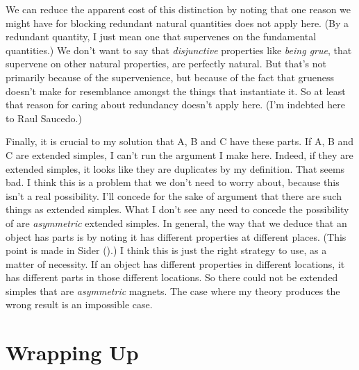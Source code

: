 \documentclass[
  10pt,
  letterpaper,
  DIV=11,
  numbers=noendperiod,
  twoside]{scrartcl}
\begin{document}
We can reduce the apparent cost of this distinction by noting that one
reason we might have for blocking redundant natural quantities does not
apply here. (By a redundant quantity, I just mean one that supervenes on
the fundamental quantities.) We don't want to say that
\emph{disjunctive} properties like \emph{being grue}, that supervene on
other natural properties, are perfectly natural. But that's not
primarily because of the supervenience, but because of the fact that
grueness doesn't make for resemblance amongst the things that
instantiate it. So at least that reason for caring about redundancy
doesn't apply here. (I'm indebted here to Raul Saucedo.)

Finally, it is crucial to my solution that A, B and C have these parts.
If A, B and C are extended simples, I can't run the argument I make
here. Indeed, if they are extended simples, it looks like they are
duplicates by my definition. That seems bad. I think this is a problem
that we don't need to worry about, because this isn't a real
possibility. I'll concede for the sake of argument that there are such
things as extended simples. What I don't see any need to concede the
possibility of are \emph{asymmetric} extended simples. In general, the
way that we deduce that an object has parts is by noting it has
different properties at different places. (This point is made in Sider
().) I think this is just the right
strategy to use, as a matter of necessity. If an object has different
properties in different locations, it has different parts in those
different locations. So there could not be extended simples that are
\emph{asymmetric} magnets. The case where my theory produces the wrong
result is an impossible case.

\section{Wrapping Up}\label{wrapping-up}
\end{document}
